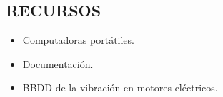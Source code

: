 
\subsection{RECURSOS}
\begin{itemize}	
	\item Computadoras portátiles.
	\item Documentación.
	\item BBDD de la vibración en motores eléctricos.
\end{itemize}	